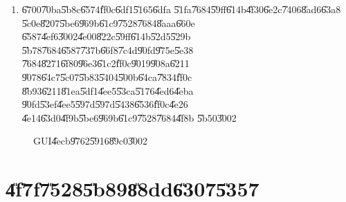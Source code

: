 \begin{enumerate}
\item \U{6700}\U{70ba}\U{5b8c}\U{6574}\U{ff0c}\U{6df1}\U{5165}\U{6dfa}%
\U{51fa}\U{7684}\U{59ff}\U{614b}\U{4f30}\U{6e2c}\U{7406}\U{8ad6}\U{63a8}%
\U{5c0e}\U{8207}\U{5be6}\U{969b}\U{61c9}\U{7528}\U{7684}\U{8aaa}\U{660e}%
\U{6587}\U{4ef6}\U{3002}\U{4e00}\U{822c}\U{59ff}\U{614b}\U{52d5}\U{529b}%
\U{5b78}\U{7684}\U{6587}\U{737b}\U{66f8}\U{7c4d}\U{90fd}\U{975e}\U{5e38}%
\U{7684}\U{8271}\U{6f80}\U{96e3}\U{61c2}\U{ff0c}\U{9019}\U{908a}\U{6211}%
\U{9078}\U{64c7}\U{5c07}\U{5b83}\U{5404}\U{500b}\U{64ca}\U{7834}\U{ff0c}%
\U{8b93}\U{6211}\U{81ea}\U{5df1}\U{4ee5}\U{53ca}\U{5176}\U{4ed6}\U{4eba}%
\U{90fd}\U{53ef}\U{4ee5}\U{597d}\U{597d}\U{5438}\U{6536}\U{ff0c}\U{4e26}%
\U{4e14}\U{63d0}\U{4f9b}\U{5be6}\U{969b}\U{61c9}\U{7528}\U{7684}\U{4f8b}%
\U{5b50}\U{3002}
\end{enumerate}

\begin{figure}[th]
\caption{GUI\U{4ecb}\U{9762}\U{5916}\U{89c0}\U{3002}}
\label{gui_appear}
\begin{center}
\end{center}
\end{figure}

\section{\U{4f7f}\U{7528}\U{5b89}\U{88dd}\U{6307}\U{5357}}

